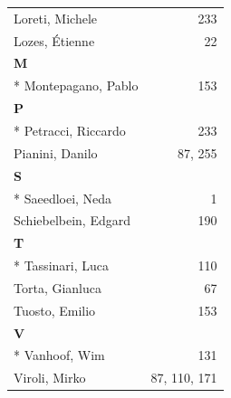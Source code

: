 \documentclass[]{llncs}
\begin{document}
\begin{longtable}{l@{~~~~~}r}
Loreti, Michele & 233
\\
Lozes, \'Etienne & 22
\\
\textbf{M} \\*
Montepagano, Pablo & 153
\\
\textbf{P} \\*
Petracci, Riccardo & 233
\\
Pianini, Danilo & 87, 255
\\
\textbf{S} \\*
Saeedloei, Neda & 1
\\
Schiebelbein, Edgard & 190
\\
\textbf{T} \\*
Tassinari, Luca & 110
\\
Torta, Gianluca & 67
\\
Tuosto, Emilio & 153
\\
\textbf{V} \\*
Vanhoof, Wim & 131
\\
Viroli, Mirko & 87, 110, 171
\end{longtable}
\end{document}
